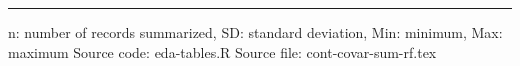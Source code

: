 \vspace{0.67cm}
 
\begin{minipage}{1\linewidth}
\linespread{1.1}\selectfont
\rule{1\linewidth}{0.4pt}
\vspace{0.02cm}
n: number of records summarized,
                 SD: standard deviation,
                 Min: minimum, Max: maximum \newline
Source code: eda-tables.R \newline
Source file: cont-covar-sum-rf.tex \newline
\end{minipage}
